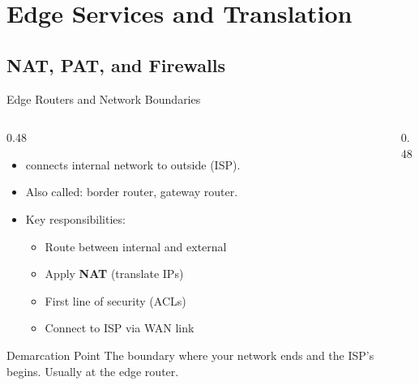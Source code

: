 \documentclass[aspectratio=169]{beamer}  %
\begin{document}
\section{Edge Services and Translation}
\subsection{NAT, PAT, and Firewalls}


\begin{frame}{Edge Routers and Network Boundaries}
    \begin{columns}[T]
        \begin{column}{0.48\textwidth}
            \begin{itemize}
                \item {} connects internal network to outside (ISP).
                \item Also called: border router, gateway router.
                \item Key responsibilities:
                    \begin{itemize}
                        \small
                        \item Route between internal and external
                        \item Apply \textbf{NAT} (translate IPs)
                        \item First line of security (ACLs)
                        \item Connect to ISP via WAN link
                    \end{itemize}
            \end{itemize}
            
            \vspace{0.2em}
            \begin{alertblock}{Demarcation Point}
                \small
                The boundary where your network ends and the ISP's begins. Usually at the edge router.
            \end{alertblock}
        \end{column}
        \begin{column}{0.48\textwidth}
            \begin{center}
\end{center}
\end{column}
\end{columns}
\end{frame}
\end{document}

